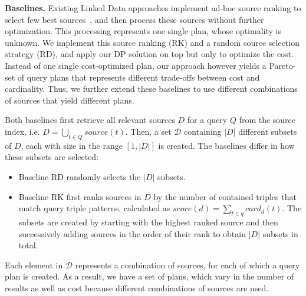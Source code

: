 \textbf{Baselines.} Existing Linked Data approaches implement ad-hoc
source ranking to select few best
sources~\cite{harth_data_2010,ladwig_linked_2010}, and then process
these sources without further optimization. This processing represents
one single plan, whose optimality is unknown. We implement this source
ranking (RK) and a random source selection strategy (RD), and 
apply our DP solution on top but only to
optimize the cost. 
Instead of one
single cost-optimized plan, our approach however yields a Pareto-set
of query plans that represents different trade-offs between cost and
cardinality. Thus, we further extend these baselines to use different
combinations of sources that yield different plans.

Both baselines first retrieve all relevant sources $D$ for a query $Q$
from the source index, i.e. $D = \bigcup_{t \in Q} source(t)$. Then,
a set $\mathcal{D}$ containing $|D|$ different subsets of $D$, each
with size in the range $[1,|D|]$ is created.
The baselines differ in how these
subsets are selected:
\begin{itemize}
\item Baseline RD randomly selects the $|D|$ subsets.
\item Baseline RK first ranks sources in $D$ by the number of
  contained triples that match query triple patterns, calculated as
  $score(d) = \sum_{t \in q} card_d(t)$. The subsets are created
  by starting with the highest ranked source and then successively
  adding sources in the order of their rank to obtain $|D|$ subsets in
  total.
\end{itemize}
Each element in $\mathcal{D}$ represents a combination of sources, for each of which a query plan is created. As a
result, we have a set of plans, which vary in the number of results as
well as cost because different combinations of sources are used.

